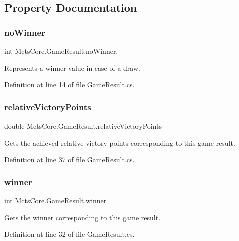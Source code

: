 \subsection{Property Documentation}
\mbox{\label{class_mcts_core_1_1_game_result_acd7dea3def32dcf23531395d28688a4e}} 
\subsubsection{\texorpdfstring{no\+Winner}{noWinner}}
{\footnotesize\ttfamily int Mcts\+Core.\+Game\+Result.\+no\+Winner\hspace{0.3cm}{\ttfamily [static]}, {\ttfamily [get]}}



Represents a winner value in case of a draw. 



Definition at line 14 of file Game\+Result.\+cs.

\mbox{\label{class_mcts_core_1_1_game_result_a9620ecf5f08cc09f1d2ea5bf5568c3cc}} 
\subsubsection{\texorpdfstring{relative\+Victory\+Points}{relativeVictoryPoints}}
{\footnotesize\ttfamily double Mcts\+Core.\+Game\+Result.\+relative\+Victory\+Points\hspace{0.3cm}{\ttfamily [get]}}



Gets the achieved relative victory points corresponding to this game result. 



Definition at line 37 of file Game\+Result.\+cs.

\mbox{\label{class_mcts_core_1_1_game_result_a77b59124aac0ba1f2cb5e0e131510cea}} 
\subsubsection{\texorpdfstring{winner}{winner}}
{\footnotesize\ttfamily int Mcts\+Core.\+Game\+Result.\+winner\hspace{0.3cm}{\ttfamily [get]}}



Gets the winner corresponding to this game result. 



Definition at line 32 of file Game\+Result.\+cs.


